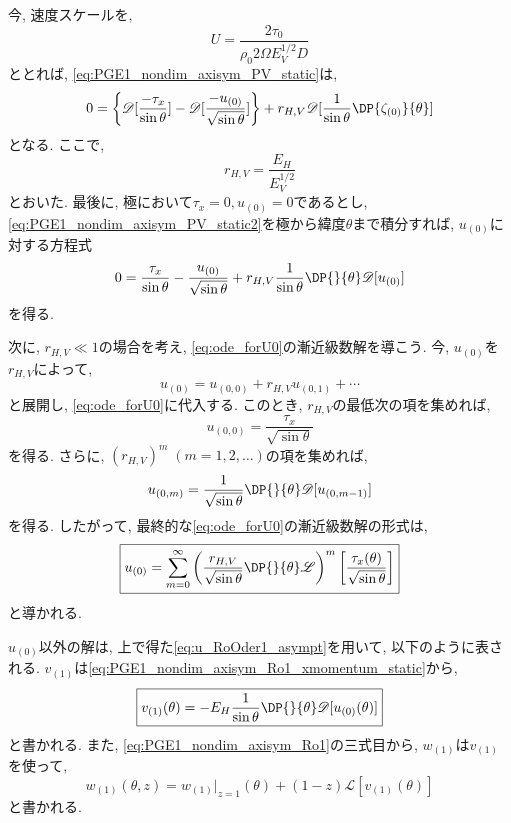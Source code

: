 今, 速度スケールを, 
\begin{equation}
  U = \dfrac{2\tau_0}{\rho_0 2\Omega E_V^{1/2} D}
\end{equation}
ととれば, \eqref{eq:PGE1_nondim_axisym_PV_static}は, 
\begin{equation}
 0 = \left\{ \mathscr{D}[\dfrac{-\tau_x}{\sin{\theta}}] 
                   - \mathscr{D}[\dfrac{-u_{(0)}}{\sqrt{\sin{\theta}}}] \right\}
    + r_{H,V} \mathscr{D}[\dfrac{1}{\sin{\theta}}\DP{\zeta_{(0)}}{\theta}]
\label{eq:PGE1_nondim_axisym_PV_static2}
\end{equation}
となる. 
ここで, 
\begin{equation}
  r_{H,V} = \dfrac{E_H}{E_V^{1/2}}
\end{equation}
とおいた. 
最後に, 極において$\tau_x=0, u_{(0)}=0$であるとし, 
\eqref{eq:PGE1_nondim_axisym_PV_static2}を極から緯度$\theta$まで積分すれば, 
$u_{(0)}$に対する方程式
\begin{equation}
  0 = \dfrac{\tau_x}{\sin{\theta}} - \dfrac{u_{(0)}}{\sqrt{\sin{\theta}}} 
     + r_{H,V} \dfrac{1}{\sin{\theta}}\DP{}{\theta} \mathscr{D}[u_{(0)}]
\label{eq:ode_forU0}
\end{equation}
を得る. 

次に, $r_{H,V} \ll 1$の場合を考え, \eqref{eq:ode_forU0}の漸近級数解を導こう. 
今, $u_{(0)}$を$r_{H,V}$によって, 
$$
 u_{(0)} = u_{(0,0)} + r_{H,V} u_{(0,1)} + \cdots
$$
と展開し, \eqref{eq:ode_forU0}に代入する. 
このとき, $r_{H,V}$の最低次の項を集めれば, 
\begin{equation}
  u_{(0,0)} = \dfrac{\tau_x}{\sqrt{\sin\theta}}
\end{equation}
を得る. 
さらに, $(r_{H,V})^m \;(m=1,2, \dots)$の項を集めれば, 
\begin{equation}
  u_{(0,m)} = \dfrac{1}{\sqrt{\sin\theta}}\DP{}{\theta}\mathscr{D}[u_{(0,m-1)}]
\end{equation}
を得る. 
したがって, 最終的な\eqref{eq:ode_forU0}の漸近級数解の形式は, 
\begin{equation}
\boxed{
  u_{(0)} = \sum_{m=0}^\infty 
              \left(\dfrac{r_{H,V}}{\sqrt{\sin\theta}} \DP{}{\theta} \mathscr{L} \right)^m 
                \left[\dfrac{\tau_x(\theta)}{\sqrt{\sin\theta}}\right]
}
\label{eq:u_RoOder1_asympt}
\end{equation}
と導かれる. 

$u_{(0)}$以外の解は, 上で得た\eqref{eq:u_RoOder1_asympt}を用いて, 以下のように表される. 
$v_{(1)}$は\eqref{eq:PGE1_nondim_axisym_Ro1_xmomentum_static}から,
\begin{equation}
\boxed{
  v_{(1)} (\theta) = - E_H \dfrac{1}{\sin\theta} \DP{}{\theta} \mathscr{D}[u_{(0)}(\theta)]
}
\end{equation}
と書かれる. 
また, \eqref{eq:PGE1_nondim_axisym_Ro1}の三式目から, $w_{(1)}$は$v_{(1)}$を使って, 
\begin{equation}
\boxed{
  w_{(1)}(\theta,z) = w_{(1)}|_{z=1}(\theta) + (1-z) \mathscr{L}[v_{(1)}(\theta)] 
}
\end{equation}
と書かれる. 
